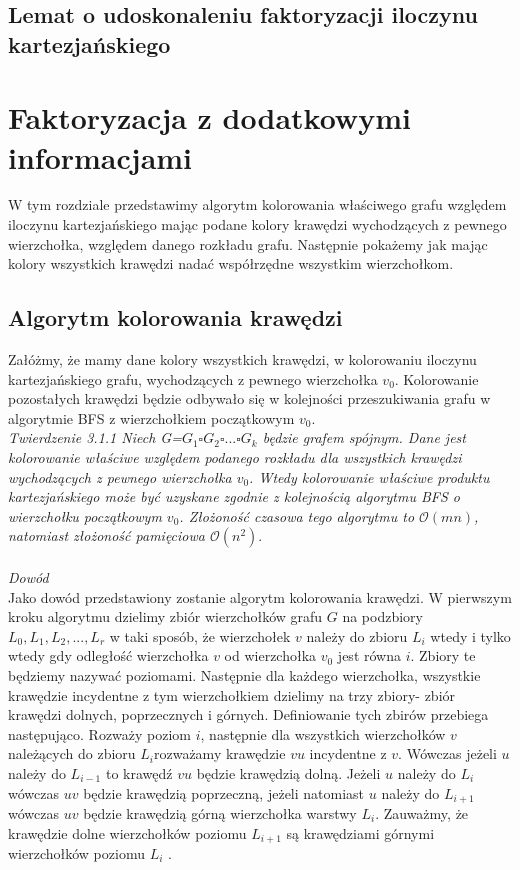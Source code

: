 \documentclass[12pt,a4paper,titlepage]{article}
\begin{document}
\subsection{Lemat o udoskonaleniu faktoryzacji iloczynu kartezjańskiego}
\newpage
\section{Faktoryzacja z dodatkowymi informacjami}
W tym rozdziale przedstawimy algorytm kolorowania właściwego grafu względem iloczynu kartezjańskiego mając podane kolory krawędzi wychodzących z pewnego wierzchołka, względem danego rozkładu grafu. Następnie pokażemy jak mając kolory wszystkich krawędzi nadać współrzędne wszystkim wierzchołkom. 
\\
\subsection{Algorytm kolorowania krawędzi}
Załóżmy, że mamy dane kolory wszystkich krawędzi, w kolorowaniu iloczynu kartezjańskiego grafu, wychodzących z pewnego wierzchołka $v_0$. Kolorowanie pozostałych krawędzi będzie odbywało się w kolejności przeszukiwania grafu w algorytmie BFS z wierzchołkiem początkowym $v_0$. \\
\textit{Twierdzenie 3.1.1 Niech G=$G_1 \square G_2 \square ... \square G_k$ będzie grafem spójnym. Dane jest kolorowanie właściwe względem podanego rozkładu dla wszystkich krawędzi wychodzących z pewnego wierzchołka $v_0$. Wtedy kolorowanie właściwe produktu kartezjańskiego może być uzyskane zgodnie z kolejnością algorytmu BFS o wierzchołku początkowym $v_0$. Złożoność czasowa tego algorytmu to $\mathcal{O}(mn)$, natomiast złożoność pamięciowa $\mathcal{O}(n^2)$}.\\
\\
\textit{Dowód}\\
Jako dowód przedstawiony zostanie algorytm kolorowania krawędzi. W pierwszym kroku algorytmu dzielimy zbiór wierzchołków grafu $G$ na podzbiory $L_0 , L_1, L_2 , ..., L_r$ w taki sposób, że wierzchołek $v$ należy do zbioru $L_i$ wtedy i tylko wtedy gdy odległość wierzchołka $v$ od wierzchołka $v_0$ jest równa $i$. Zbiory te będziemy nazywać poziomami. Następnie dla każdego wierzchołka, wszystkie krawędzie incydentne z tym wierzchołkiem dzielimy na trzy zbiory- zbiór krawędzi dolnych, poprzecznych i górnych. Definiowanie tych zbirów przebiega następująco. Rozważy poziom $i$, następnie dla wszystkich wierzchołków $v$ należących do zbioru $L_i$rozważamy krawędzie $vu$ incydentne z $v$. Wówczas jeżeli $u$ należy do $L_{i-1}$ to krawędź $vu$ będzie krawędzią dolną. Jeżeli $u$ należy do $L_i$ wówczas $uv$ będzie krawędzią poprzeczną, jeżeli natomiast $u$ należy do $L_{i+1}$ wówczas $uv$ będzie krawędzią górną wierzchołka warstwy $L_i$. Zauważmy, że krawędzie dolne wierzchołków poziomu $L_{i+1}$ są krawędziami górnymi wierzchołków poziomu $L_{i}$ .\\
\end{document}
